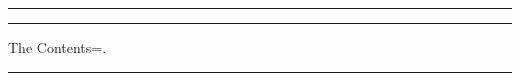 \thispagestyle{plain}
\renewcommand*{\thefootnote}{\fnsymbol{footnote}}

\begin{center}

{\noindent{}}

\vspace{\baselineskip}

{\noindent{}}

{\noindent}

\vspace{\baselineskip}

\hrule{}

\vspace{0.7\baselineskip}

{\noindent\textit{\Month}\space\space{}\space\space\textit{\Year}}

\vspace{0.65\baselineskip}

\hrule{}

\vspace{1.2\baselineskip}

{\noindent\large The Contents=.}

\end{center}

\begin{hangcontent}

\textit{\ABSTRACT}

\end{hangcontent}

\vspace{1\baselineskip}

\hrule{}

\vspace{1\baselineskip}

\begin{center}

{\large\itshape\TITLE}

\vspace{0.5\baselineskip}

{\large\Title}

\end{center}